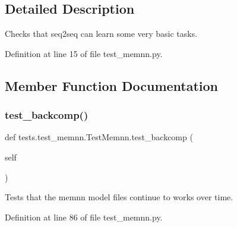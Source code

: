 \subsection{Detailed Description}
\begin{DoxyVerb}Checks that seq2seq can learn some very basic tasks.
\end{DoxyVerb}
 

Definition at line 15 of file test\+\_\+memnn.\+py.



\subsection{Member Function Documentation}
\mbox{\label{classtests_1_1test__memnn_1_1TestMemnn_a2c3a2e42a94e00651ee32a03d9b7ba84}} 
\subsubsection{\texorpdfstring{test\+\_\+backcomp()}{test\_backcomp()}}
{\footnotesize\ttfamily def tests.\+test\+\_\+memnn.\+Test\+Memnn.\+test\+\_\+backcomp (\begin{DoxyParamCaption}\item[{}]{self }\end{DoxyParamCaption})}

\begin{DoxyVerb}Tests that the memnn model files continue to works over time.
\end{DoxyVerb}
 

Definition at line 86 of file test\+\_\+memnn.\+py.


